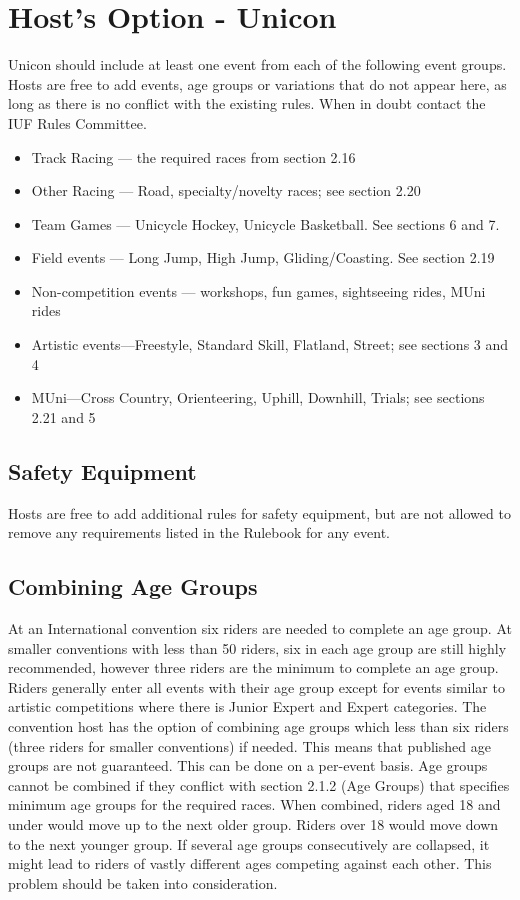 \section{Host's Option - Unicon}
Unicon should include at least one event from each of the following event groups. 
Hosts are free to add events, age groups or variations that do not appear here, as long as there is no conflict with the existing rules. 
When in doubt contact the IUF Rules Committee.
\begin{itemize}
  \item{Track Racing — the required races from section 2.16}
  \item{Other Racing — Road, specialty/novelty races; see section 2.20}
  \item{Team Games — Unicycle Hockey, Unicycle Basketball. See sections 6 and 7.}
  \item{Field events — Long Jump, High Jump, Gliding/Coasting. See section 2.19}
  \item{Non-competition events — workshops, fun games, sightseeing rides, MUni rides}
  \item{Artistic events—Freestyle, Standard Skill, Flatland, Street; see sections 3 and 4}
  \item{MUni—Cross Country, Orienteering, Uphill, Downhill, Trials; see sections 2.21 and 5}
\end{itemize}

\subsection{Safety Equipment}
Hosts are free to add additional rules for safety equipment, but are not allowed to remove any requirements listed in the Rulebook for any event.

\subsection{Combining Age Groups}
At an International convention six riders are needed to complete an age group. 
At smaller conventions with less than 50 riders, six in each age group are still highly recommended, however three riders are the minimum to complete an age group. 
Riders generally enter all events with their age group except for events similar to artistic competitions where there is Junior Expert and Expert categories. 
The convention host has the option of combining age groups which less than six riders (three riders for smaller conventions) if needed. 
This means that published age groups are not guaranteed. This can be done on a per-event basis. 
Age groups cannot be combined if they conflict with section 2.1.2 (Age Groups) that specifies minimum age groups for the required races. 
When combined, riders aged 18 and under would move up to the next older group. 
Riders over 18 would move down to the next younger group. If several age groups consecutively are collapsed, it might lead to riders of vastly different ages competing against each other. 
This problem should be taken into consideration.

